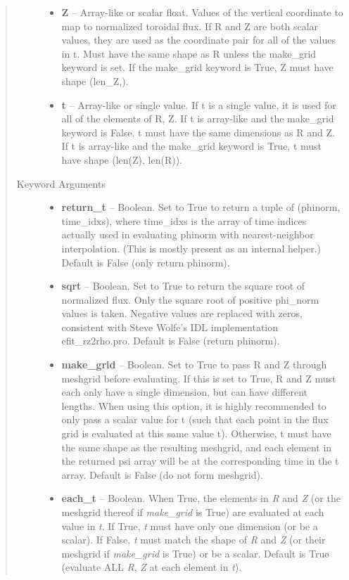 \documentclass[letterpaper,10pt,english]{sphinxmanual}
\begin{document}
\begin{fulllineitems}
\begin{fulllineitems}
\begin{quote}
\begin{description}
\begin{itemize}
\item {} 
\textbf{Z} --
Array-like or scalar float.
Values of the vertical coordinate to
map to normalized toroidal flux. If R and Z are both scalar
values, they are used as the coordinate pair for all of the
values in t. Must have the same shape as R unless the make\_grid
keyword is set. If the make\_grid keyword is True, Z must have
shape (len\_Z,).

\item {} 
\textbf{t} --
Array-like or single value.
If t is a single value, it is used
for all of the elements of R, Z. If t is array-like and the
make\_grid keyword is False, t must have the same dimensions as
R and Z. If t is array-like and the make\_grid keyword is True,
t must have shape (len(Z), len(R)).

\end{itemize}

\item[{Keyword Arguments}] \leavevmode\begin{itemize}
\item {} 
\textbf{return\_t} --
Boolean.
Set to True to return a tuple of (phinorm,
time\_idxs), where time\_idxs is the array of time indices
actually used in evaluating phinorm with nearest-neighbor
interpolation. (This is mostly present as an internal helper.)
Default is False (only return phinorm).

\item {} 
\textbf{sqrt} --
Boolean.
Set to True to return the square root of normalized
flux. Only the square root of positive phi\_norm values is taken.
Negative values are replaced with zeros, consistent with Steve
Wolfe's IDL implementation efit\_rz2rho.pro. Default is False
(return phinorm).

\item {} 
\textbf{make\_grid} --
Boolean.
Set to True to pass R and Z through meshgrid
before evaluating. If this is set to True, R and Z must each
only have a single dimension, but can have different lengths.
When using this option, it is highly recommended to only pass
a scalar value for t (such that each point in the flux grid is
evaluated at this same value t). Otherwise, t must have the
same shape as the resulting meshgrid, and each element in the
returned psi array will be at the corresponding time in the t
array. Default is False (do not form meshgrid).

\item {} 
\textbf{each\_t} --
Boolean.
When True, the elements in \emph{R} and \emph{Z} (or the meshgrid thereof
if \emph{make\_grid} is True) are evaluated at each value in \emph{t}. If
True, \emph{t} must have only one dimension (or be a scalar). If
False, \emph{t} must match the shape of \emph{R} and \emph{Z} (or their
meshgrid if \emph{make\_grid} is True) or be a scalar. Default is True
(evaluate ALL \emph{R}, \emph{Z} at each element in \emph{t}).


\end{itemize}
\end{description}
\end{quote}
\end{fulllineitems}
\end{fulllineitems}
\end{document}
